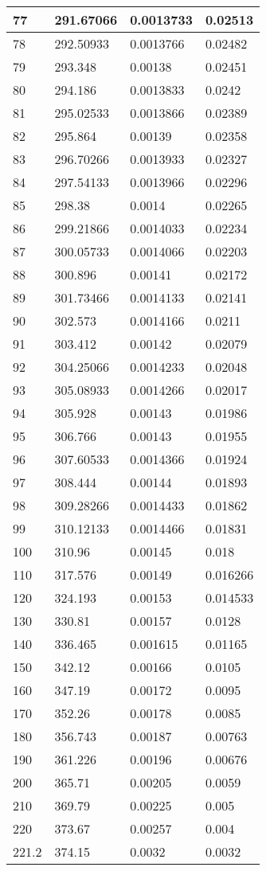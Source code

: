 \documentclass[twocolumn]{article}
\begin{document}
\begin{tabular}{l|l|l|l}
77	&	291.67066&	0.0013733&	0.02513  \\ \hline
78	&	292.50933&	0.0013766&	0.02482  \\ \hline
79	&	293.348	&	0.00138	&	0.02451  \\ \hline
80	&	294.186&	0.0013833&	0.0242  \\ \hline
81	&	295.02533&	0.0013866&	0.02389  \\ \hline
82	&	295.864	&	0.00139	&	0.02358  \\ \hline
83	&	296.70266&	0.0013933&	0.02327  \\ \hline
84	&	297.54133&	0.0013966&	0.02296  \\ \hline
85	&	298.38	&	0.0014	&	0.02265  \\ \hline
86	&	299.21866&	0.0014033&	0.02234  \\ \hline
87	&	300.05733&	0.0014066&	0.02203  \\ \hline
88	&	300.896	&	0.00141	&	0.02172  \\ \hline
89	&	301.73466&	0.0014133&	0.02141  \\ \hline
90	&	302.573&	0.0014166&	0.0211  \\ \hline
91	&	303.412	&	0.00142	&	0.02079  \\ \hline
92	&	304.25066&	0.0014233&	0.02048  \\ \hline
93	&	305.08933&	0.0014266&	0.02017  \\ \hline
94	&	305.928	&	0.00143	&	0.01986  \\ \hline
95	&	306.766&	0.00143&	0.01955  \\ \hline
96	&	307.60533&	0.0014366&	0.01924  \\ \hline
97	&	308.444	&	0.00144	&	0.01893  \\ \hline
98	&	309.28266&	0.0014433&	0.01862  \\ \hline
99	&	310.12133&	0.0014466&	0.01831  \\ \hline
100	&	310.96	&	0.00145	&	0.018  \\ \hline
110	&	317.576&	0.00149	&	0.016266\\ \hline
120	&	324.193&	0.00153	&	0.014533\\ \hline
130	&	330.81	&	0.00157	&	0.0128  \\ \hline
140	&	336.465	&	0.001615	&	0.01165  \\ \hline
150	&	342.12	&	0.00166	&	0.0105  \\ \hline
160	&	347.19	&	0.00172	&	0.0095  \\ \hline
170	&	352.26	&	0.00178	&	0.0085  \\ \hline
180	&	356.743&	0.00187	&	0.00763\\ \hline
190	&	361.226&	0.00196	&	0.00676\\ \hline
200	&	365.71	&	0.00205	&	0.0059  \\ \hline
210	&	369.79	&	0.00225	&	0.005  \\ \hline
220	&	373.67	&	0.00257	&	0.004  \\ \hline
221.2	&	374.15	&	0.0032	&	0.0032  \\ \hline
\end{tabular}
\end{document}
